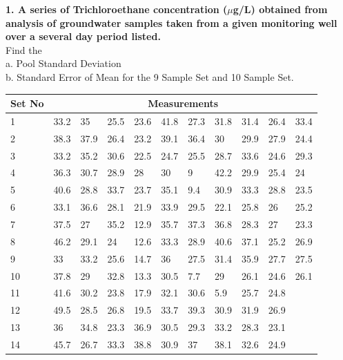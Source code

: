 \documentclass[12pt,a4paper,oneside]{article}
\begin{document}

\newpage
{}
\setcounter{page}{1}

\textbf{1. A series of Trichloroethane concentration ($\mu$g/L) obtained from analysis of groundwater samples taken from a given monitoring well over a several day period listed.}\\
Find the \\
a. Pool Standard Deviation \\
b. Standard Error of Mean for the 9 Sample Set  and 10 Sample Set. \\ 

\begin{tabular}{ | l | l | l | l | l | l | l | l | l | l | l | }
\hline
    Set No &  \multicolumn{10}{|c|}{Measurements}  \\ \hline
    1 & 33.2 & 35 & 25.5 & 23.6 & 41.8 & 27.3 & 31.8 & 31.4 & 26.4 & 33.4 \\ \hline
    2 & 38.3 & 37.9 & 26.4 & 23.2 & 39.1 & 36.4 & 30 & 29.9 & 27.9 & 24.4 \\ \hline
    3 & 33.2 & 35.2 & 30.6 & 22.5 & 24.7 & 25.5 & 28.7 & 33.6 & 24.6 & 29.3 \\ \hline
    4 & 36.3 & 30.7 & 28.9 & 28 & 30 & 9 & 42.2 & 29.9 & 25.4 & 24 \\ \hline
    5 & 40.6 & 28.8 & 33.7 & 23.7 & 35.1 & 9.4 & 30.9 & 33.3 & 28.8 & 23.5 \\ \hline
    6 & 33.1 & 36.6 & 28.1 & 21.9 & 33.9 & 29.5 & 22.1 & 25.8 & 26 & 25.2 \\ \hline
    7 & 37.5 & 27 & 35.2 & 12.9 & 35.7 & 37.3 & 36.8 & 28.3 & 27 & 23.3 \\ \hline
    8 & 46.2 & 29.1 & 24 & 12.6 & 33.3 & 28.9 & 40.6 & 37.1 & 25.2 & 26.9 \\ \hline
    9 & 33 & 33.2 & 25.6 & 14.7 & 36 & 27.5 & 31.4 & 35.9 & 27.7 & 27.5 \\ \hline
    10 & 37.8 & 29 & 32.8 & 13.3 & 30.5 & 7.7 & 29 & 26.1 & 24.6 & 26.1 \\ \hline
    11 & 41.6 & 30.2 & 23.8 & 17.9 & 32.1 & 30.6 & 5.9 & 25.7 & 24.8 &  \\ \hline
    12 & 49.5 & 28.5 & 26.8 & 19.5 & 33.7 & 39.3 & 30.9 & 31.9 & 26.9 &  \\ \hline
    13 & 36 & 34.8 & 23.3 & 36.9 & 30.5 & 29.3 & 33.2 & 28.3 & 23.1 &  \\ \hline
    14 & 45.7 & 26.7 & 33.3 & 38.8 & 30.9 & 37 & 38.1 & 32.6 & 24.9 &  \\ \hline
\end{tabular}
\\ 
\end{document}
